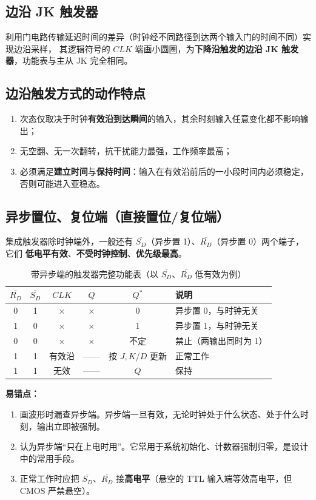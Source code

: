 \subsection{边沿 JK 触发器}
利用门电路传输延迟时间的差异（时钟经不同路径到达两个输入门的时间不同）实现边沿采样，
其逻辑符号的 $CLK$ 端画小圆圈，为\textbf{下降沿触发的边沿 JK 触发器}，功能表与主从 JK 完全相同。

\subsection{边沿触发方式的动作特点}
\begin{enumerate}
    \item 次态仅取决于时钟\textbf{有效沿到达瞬间}的输入，其余时刻输入任意变化都不影响输出；
    \item 无空翻、无一次翻转，抗干扰能力最强，工作频率最高；
    \item 必须满足\textbf{建立时间}与\textbf{保持时间}：输入在有效沿前后的一小段时间内必须稳定，否则可能进入亚稳态。
\end{enumerate}

\subsection{异步置位、复位端（直接置位/复位端）}
集成触发器除时钟端外，一般还有 $\overline{S_D}$（异步置 1）、$\overline{R_D}$（异步置 0）两个端子，它们
\textbf{低电平有效}、\textbf{不受时钟控制}、\textbf{优先级最高}。

\begin{table}[!htbp]
\centering
\caption{带异步端的触发器完整功能表（以 $\overline{S_D}$、$\overline{R_D}$ 低有效为例）}
\begin{tabular}{cc|cc|cl}
\toprule
$\overline{R_D}$ & $\overline{S_D}$ & $CLK$ & $Q$ & $Q^*$ & 说明 \\
\midrule
0 & 1 & $\times$ & $\times$ & 0 & 异步置 0，与时钟无关 \\
1 & 0 & $\times$ & $\times$ & 1 & 异步置 1，与时钟无关 \\
0 & 0 & $\times$ & $\times$ & 不定 & 禁止（两输出同时为 1） \\
1 & 1 & 有效沿 & —— & 按 $J,K$/$D$ 更新 & 正常工作 \\
1 & 1 & 无效 & —— & $Q$ & 保持 \\
\bottomrule
\end{tabular}
\end{table}

\noindent\textbf{易错点：}
\begin{enumerate}
    \item 画波形时漏查异步端。异步端一旦有效，无论时钟处于什么状态、处于什么时刻，输出立即被强制。
    \item 认为异步端“只在上电时用”。它常用于系统初始化、计数器强制归零，是设计中的常用手段。
    \item 正常工作时应把 $\overline{S_D}$、$\overline{R_D}$ 接\textbf{高电平}（悬空的 TTL 输入端等效高电平，但 CMOS 严禁悬空）。
\end{enumerate}

